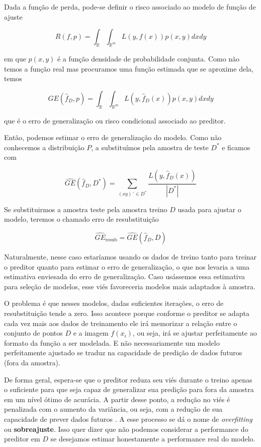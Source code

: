 \documentclass[
  12pt,
  oneside,
  a4paper,
  chapter=TITLE,
  section=TITLE,
  brazil]{abntex2}
\begin{document}
Dada a função de perda, pode-se definir o risco associado ao modelo de
função de ajuste

\[R(f, p) = \int_{\mathbb{R}}{}\int_{\mathbb{R}^m}{} L(y, f(x))p(x, y)dxdy\]

em que \(p(x, y)\) é a função densidade de probabilidade conjunta. Como
não temos a função real mas procuramos uma função estimada que se
aproxime dela, temos

\[GE(\hat{f}_D, p) = \int_{\mathbb{R}}{}\int_{\mathbb{R}^m}{} L(y, \hat{f}_D(x))p(x, y)dxdy \tag{1}\]

que é o erro de generalização ou risco condicional associado ao
preditor.

Então, podemos estimar o erro de generalização do modelo. Como não
conhecemos a distribuição \(P\), a substituímos pela amostra de teste
\(D^*\) e ficamos com

\[\widehat{GE}(\hat{f}_D, D^*) = \sum_{(xy)´ \in D^*} \frac{L(y, \hat{f}_D(x))}{|D^*|}\]

Se substituirmos a amostra teste pela amostra treino \(D\) usada para
ajustar o modelo, teremos o chamado erro de resubstituição

\[\widehat{GE}_\text{resub} = \widehat{GE}(\hat{f}_D, D)\]

Naturalmente, nesse caso estaríamos usando os dados de treino tanto para
treinar o preditor quanto para estimar o erro de generalização, o que
nos levaria a uma estimativa enviesada do erro de generalização. Caso
usássemos essa estimativa para seleção de modelos, esse viés favoreceria
modelos mais adaptados à amostra.

O problema é que nesses modelos, dadas suficientes iterações, o erro de
resubstituição tende a zero. Isso acontece porque conforme o preditor se
adapta cada vez mais aos dados de treinamento ele irá memorizar a
relação entre o conjunto de pontos \(D\) e a imagem \(f(x_i)\), ou seja,
irá se ajustar perfeitamente ao formato da função a ser modelada. E não
necessariamente um modelo perfeitamente ajustado se traduz na capacidade
de predição de dados futuros (fora da amostra).

De forma geral, espera-se que o preditor reduza seu viés durante o
treino apenas o suficiente para que seja capaz de generalizar sua
predição para fora da amostra em um nível ótimo de acurácia. A partir
desse ponto, a redução no viés é penalizada com o aumento da variância,
ou seja, com a redução de sua capacidade de prever dados futuros
\autocite{bischl_resampling_2012}. A esse processo se dá o nome de
\emph{overfitting} ou \textbf{sobreajuste}. Isso quer dizer que não
podemos considerar a performance do preditor em \(D\) se desejamos
estimar honestamente a performance real do modelo.
\end{document}
